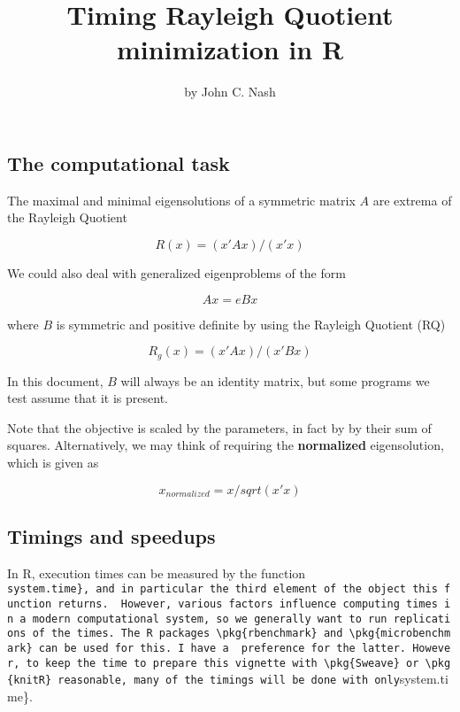 \title{Timing Rayleigh Quotient minimization in R}
\author{by John C. Nash}

\maketitle


\subsection{The computational task}\label{the-computational-task}

The maximal and minimal eigensolutions of a symmetric matrix \(A\) are extrema of the Rayleigh Quotient

\[ R(x) =  (x' A x)  / (x' x) \]

We could also deal with generalized eigenproblems of the form

\[A x = e B x\]

where \(B\) is symmetric and positive definite by using the Rayleigh Quotient (RQ)

\[ R_g(x) =  (x' A x)  / (x' B x) \]

In this document, \(B\) will always be an identity matrix, but some programs we test
assume that it is present.

Note that the objective is scaled by the parameters, in fact by by their
sum of squares. Alternatively,
we may think of requiring the \textbf{normalized} eigensolution, which is given as

\[ x_{normalized} = x/sqrt(x' x) \]

\subsection{Timings and speedups}\label{timings-and-speedups}

In R, execution times can be measured by the function \texttt{system.time\},\ and\ in\ particular\ the\ third\ element\ of\ the\ object\ this\ function\ returns.\ \ However,\ various\ factors\ influence\ computing\ times\ in\ a\ modern\ computational\ system,\ so\ we\ generally\ want\ to\ run\ replications\ of\ the\ times.\ The\ R\ packages\ \textbackslash{}pkg\{rbenchmark\}\ and\ \textbackslash{}pkg\{microbenchmark\}\ can\ be\ used\ for\ this.\ I\ have\ a\ \ preference\ for\ the\ latter.\ However,\ to\ keep\ the\ time\ to\ prepare\ this\ vignette\ with\ \textbackslash{}pkg\{Sweave\}\ or\ \textbackslash{}pkg\{knitR\}\ reasonable,\ many\ of\ the\ timings\ will\ be\ done\ with\ only}system.time\}.


